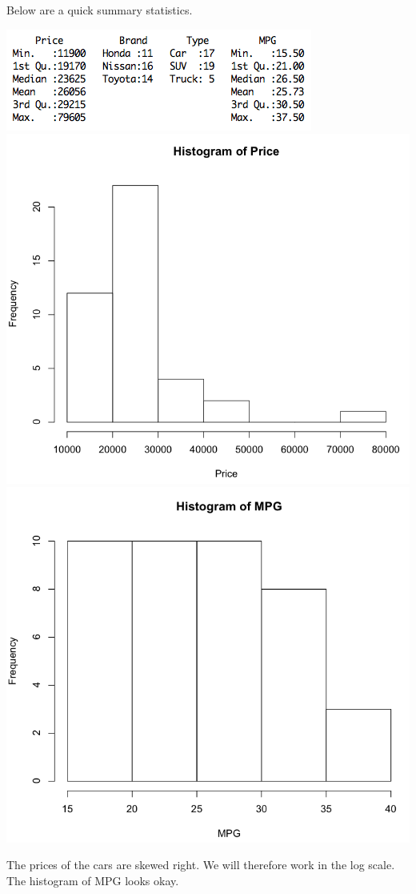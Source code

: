 \documentclass[a4 paper, 11 pt]{article}
\begin{document}
Below are a quick summary statistics.
\begin{center}
\includegraphics[scale=0.6]{sum} \\
\includegraphics[scale=0.3]{histprice}
\includegraphics[scale=0.3]{histmpg}
\end{center}
The prices of the cars are skewed right. We will therefore work in the log scale. The histogram of MPG looks okay.
\end{document}
